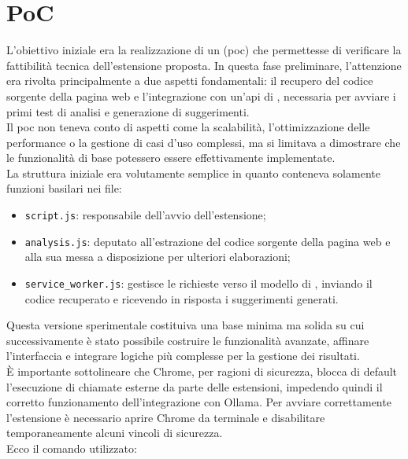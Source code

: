 \section{PoC}
\noindent L’obiettivo iniziale era la realizzazione di un  (\acrshort{poc}) che permettesse di verificare la fattibilità tecnica dell’estensione proposta. In questa fase preliminare, l’attenzione era rivolta principalmente a due aspetti fondamentali: il recupero del codice sorgente della pagina web e l’integrazione con un’\acrshort{api} di , necessaria per avviare i primi test di analisi e generazione di suggerimenti.\\
Il \acrshort{poc} non teneva conto di aspetti come la scalabilità, l’ottimizzazione delle performance o la gestione di casi d’uso complessi, ma si limitava a dimostrare che le funzionalità di base potessero essere effettivamente implementate. 
\\La struttura iniziale era volutamente semplice in quanto conteneva solamente funzioni basilari nei file:
\begin{itemize}
  \item \texttt{script.js}: responsabile dell’avvio dell’estensione;
  \item \texttt{analysis.js}: deputato all’estrazione del codice sorgente della pagina web e alla sua messa a disposizione per ulteriori elaborazioni;
  \item \texttt{service\_worker.js}: gestisce le richieste verso il modello di , inviando il codice recuperato e ricevendo in risposta i suggerimenti generati.
\end{itemize}

\noindent Questa versione sperimentale costituiva una base minima ma solida su cui successivamente è stato possibile costruire le funzionalità avanzate, affinare l’interfaccia e integrare logiche più complesse per la gestione dei risultati.\\

\noindent \label{subsec:NB}È importante sottolineare che Chrome, per ragioni di sicurezza, blocca di default l’esecuzione di chiamate esterne da parte delle estensioni, impedendo quindi il corretto funzionamento dell’integrazione con Ollama. Per avviare correttamente l’estensione è necessario aprire Chrome da terminale e disabilitare temporaneamente alcuni vincoli di sicurezza. \\
Ecco il comando utilizzato:

